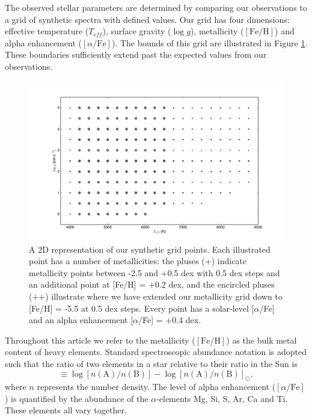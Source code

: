 \documentclass{emulateapj}
\begin{document}
The observed stellar parameters are determined by comparing our observations to a grid of synthetic spectra with defined values. Our grid has four dimensions: effective temperature ($T_{eff}$), surface gravity ($\log{g}$), metallicity ($[\mbox{Fe}/\mbox{H}]$) and alpha enhancement ($[\alpha/\mbox{Fe}]$). The bounds of this grid are illustrated in Figure \ref{fig:grid-boundaries}. These boundaries sufficiently extend past the expected values from our observations.

\begin{figure}[h!]
	\includegraphics[width=\columnwidth]{./figures/grid-points.pdf}
	\caption{A 2D representation of our synthetic grid points. Each illustrated point has a number of metallicities: the pluses (+) indicate metallicity points between -2.5 and +0.5 dex with 0.5 dex steps and an additional point at [Fe/H] = $+0.2$ dex, and the encircled pluses (++) illustrate where we have extended our metallicity grid down to [Fe/H] = -5.5 at 0.5 dex steps. Every point has a solar-level [$\alpha$/Fe] and an alpha enhancement [$\alpha$/Fe] = +0.4 dex.}
	\label{fig:grid-boundaries}
\end{figure}




Throughout this article we refer to the metallicity ($[\mbox{Fe}/\mbox{H}]$) as the bulk metal content of heavy elements. Standard spectroscopic abundance notation is adopted such that the ratio of two elements in a star relative to their ratio in the Sun is
\begin{equation}
[\mbox{A}/\mbox{B}] \equiv \log{[n(\mbox{A})/n(\mbox{B})]} - \log{[n(\mbox{A})/n(\mbox{B})]}_\odot,
\end{equation}
\noindent{}where $n$ represents the number density. The level of alpha enhancement ($[\alpha/\mbox{Fe}]$) is quantified by the abundance of the $\alpha$-elements Mg, Si, S, Ar, Ca and Ti. These elements all vary together. 
\end{document}
